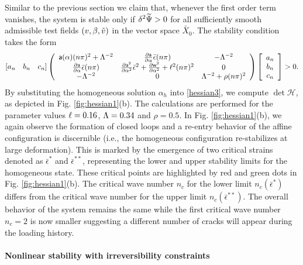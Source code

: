 \documentclass[10pt]{article}
\begin{document}
Similar to the previous section we claim that, whenever the first order term vanishes, the system is stable only if $\delta^2 \Ecompl
%
>0$ for all sufficiently smooth admissible test fields $(v, \beta, \tilde v)$ in the vector space $\widetilde{ X_0}$. The stability condition  takes the form
\begin{align}
    \left[ a_n \quad b_n \quad c_n \right]\left(
\begin{array}{ccc}
\mathsf{a}(\alpha)(n\pi)^2+\Lambda^{-2}& \frac{\partial \mathsf{a}}{\partial \alpha}\bar\epsilon(n\pi) &  -\Lambda^{-2} \\
\frac{\partial \mathsf{a}}{\partial \alpha}\bar\epsilon(n\pi) & \frac{\partial \mathsf{a}^2}{\partial \alpha^2}\bar\epsilon^2+ \frac{\partial \mathsf{w}^2}{\partial \alpha^2}+\ell^2(n\pi)^2 & 0 \\
 -\Lambda^{-2} & 0 & \Lambda^{-2} +\rho (n\pi)^2\\
\end{array}
\right)\left[ \begin{array}{c} a_n \\ b_n \\c_n \end{array} \right]>0.\label{hessian3}\end{align}
By substituting the homogeneous solution $\alpha_h$ into \eqref{hessian3}, we compute $\det \mathcal{H}$, as depicted  in Fig. \ref{fig:hessian1}(b). The calculations are performed for the parameter values $\ell=0.16$, $\Lambda=0.34$ and $\rho=0.5$.  In Fig. \ref{fig:hessian1}(b), we again observe the formation of closed loops and a re-entry behavior of the affine configuration is discernible  (i.e., the homogeneous configuration re-stabilizes at large deformation). This is marked by the emergence of two critical strains denoted as $\bar\epsilon^*$ and $\bar\epsilon^{**}$, representing the lower and upper stability limits for the homogeneous state. These critical points are highlighted by red and green dots in Fig. \ref{fig:hessian1}(b). The critical wave number $n_c$ for the lower limit $n_c(\bar{\epsilon}^*)$    differs from the critical wave number for the upper limit $n_c(\bar{\epsilon}^{**})$. The overall behavior of the system remains the same while the first critical wave number $n_c=2$ is now smaller suggesting a different number of cracks will appear during the loading history.




%

\paragraph{Nonlinear stability with irreversibility constraints}
\end{document}
